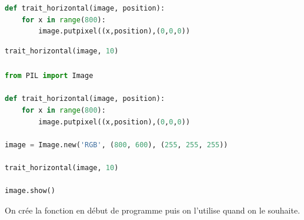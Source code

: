 \documentclass[svgnames,11pt]{beamer}
\begin{document}
\begin{frame}[fragile]
    \frametitle{}

\begin{center}
\begin{lstlisting}[language=Python , basicstyle=\ttfamily\small, xleftmargin=2em, xrightmargin=2em]
def trait_horizontal(image, position):
    for x in range(800):
        image.putpixel((x,position),(0,0,0))
\end{lstlisting}
\label{CODE}
\end{center}

\begin{center}
\begin{lstlisting}[language=Python , basicstyle=\ttfamily\small, xleftmargin=2em, xrightmargin=2em]
trait_horizontal(image, 10)
\end{lstlisting}
\label{CODE}
\end{center}

\end{frame}
\begin{frame}[fragile]
    \frametitle{}

\begin{center}
\begin{lstlisting}[language=Python , basicstyle=\ttfamily\small, xleftmargin=0.em, xrightmargin=0.em]
from PIL import Image

def trait_horizontal(image, position):
    for x in range(800):
        image.putpixel((x,position),(0,0,0))

image = Image.new('RGB', (800, 600), (255, 255, 255))

trait_horizontal(image, 10)

image.show()
\end{lstlisting}
\label{img}
\end{center} 
\begin{aretenir}[]
    On crée la fonction en début de programme puis on l'utilise quand on le souhaite.
    \end{aretenir}
\end{frame}
\end{document}

